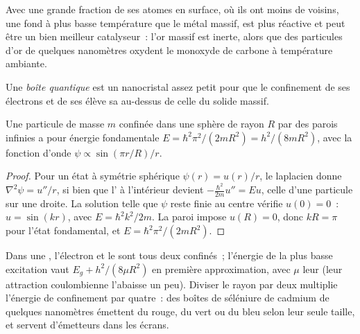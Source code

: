 Avec une grande fraction de ses atomes en surface, où ils ont moins de
voisins, une  fond à plus basse température que le métal
massif, est plus réactive et peut être un bien meilleur catalyseur~: l'or
massif est inerte, alors que des particules d'or de quelques nanomètres
oxydent le monoxyde de carbone à température ambiante.

\begin{definition}\label{def:b3:inorganic-materials:quantum-dot}
Une \emph{boîte quantique} est un nanocristal
 assez petit pour que le confinement de ses électrons et de
ses  élève sa  au-dessus de celle du solide massif.
\end{definition}

\begin{theorem}\label{thm:b3:inorganic-materials:quantum-dot}
Une particule de masse $m$ confinée dans une sphère de rayon $R$ par des
parois infinies a pour énergie fondamentale $E = \hbar^2\pi^2/(2mR^2) = h^2/(8mR^2)$, avec la fonction d'onde $\psi \propto \sin(\pi r/R)/r$.
\end{theorem}

\begin{proof}
Pour un état à symétrie sphérique $\psi(r) = u(r)/r$, le laplacien donne
$\nabla^2\psi = u''/r$, si bien que l' à l'intérieur devient $-\frac{\hbar^2}{2m}u'' = Eu$, celle d'une particule sur une
droite. La solution telle que $\psi$ reste finie au centre vérifie $u(0) = 0$~: $u = \sin(kr)$, avec $E = \hbar^2k^2/2m$.
La paroi impose $u(R) = 0$, donc $kR = \pi$ pour l'état fondamental, et $E = \hbar^2\pi^2/(2mR^2)$.
\end{proof}

Dans une , l'électron et le  sont tous deux confinés~;
l'énergie de la plus basse excitation vaut $E_g + h^2/(8\mu R^2)$ en première approximation, avec $\mu$ leur  (leur attraction coulombienne l'abaisse un peu). Diviser le rayon
par deux multiplie l'énergie de confinement par quatre~: des boîtes de
séléniure de cadmium de quelques nanomètres émettent du rouge, du vert ou
du bleu selon leur seule taille, et servent d'émetteurs dans les écrans.

